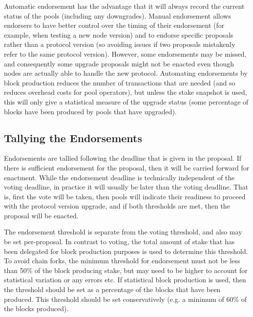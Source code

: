 Automatic endorsement has the advantage that it will always record the current
status of the pools (including any downgrades).
Manual endorsement allows endorsers to have better control over
the timing of their endorsement (for example, when testing a new node version)
and to endorse specific proposals rather than a protocol version (so avoiding issues if two proposals
mistakenly refer to the same protocol version).  However, some
endorsements may be missed, and consequently some upgrade proposals might not be enacted
even though nodes are actually able to handle the new protocol.
Automating endorsements by block production reduces the number of transactions that are needed (and so reduces overhead costs for pool operators),
but unless the stake snapshot is used, this will only give a statistical measure of the upgrade status (some percentage of blocks have been produced by
pools that have upgraded).

\subsection{Tallying the Endorsements}

Endorsements are tallied following the deadline that is given in the proposal.
If there is sufficient endorsement for the proposal, then it will be carried
forward for enactment.  While the endorsement deadline is technically
independent of the voting deadline, in practice it will usually be later than the
voting deadline. That is, first the vote will be taken, then pools will indicate
their readiness to proceed with the protocol version upgrade, and if both thresholds are met,
then the proposal will be enacted.

The endorsement threshold is separate from the voting threshold, and also
may be set per-proposal.  %
In contrast to voting, the total amount of stake that has been delegated for block production purposes is used to determine this
threshold. 
To avoid chain forks, the minimum threshold for endorsement must not be less than 50\%
of the block producing stake, but may need to be higher to account for statistical variation or any errors etc.
If statistical block production is used, then the threshold should be set as a percentage of the blocks that have been produced.
This threshold should be set conservatively (e.g. a minimum of 60\% of the blocks produced).
